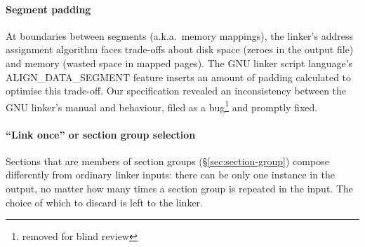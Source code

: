

\paragraph{Segment padding}
At boundaries between segments (a.k.a.\ memory mappings), 
the linker's address assignment algorithm 
faces trade-offs about disk space (zeroes in the output file)
and memory (wasted space in mapped pages).
The GNU linker script language's 
\textsf{ALIGN\_DATA\_SEGMENT} feature 
inserts an amount of padding calculated to optimise this trade-off.
Our specification revealed an inconsistency between the GNU linker's 
manual and behaviour, filed as a bug\footnote{%
removed for blind review} and promptly fixed.


\paragraph{``Link once'' or section group selection}
Sections that are members of section groups (\S\ref{sec:section-group}) compose differently
from ordinary linker inputs:
there can be only one instance in the output, no matter how many times
a section group is repeated in the input.
The choice of which to discard is left to the linker.

